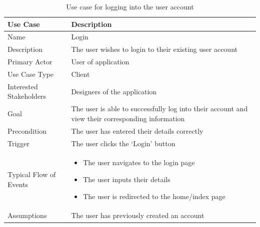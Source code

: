 \documentclass[10pt,twocolumn]{witseiepaper}
\begin{document}
		\begin{table}[htbp]
			\centering
			\caption{Use case for logging into the user account}
			\label{uc:login}
			\begin{tabular}{|p{}|p{}|}
				\hline
				\textbf{Use Case} & \textbf{Description} \\ \hline
				Name & Login \\ \hline
				Description & The user wishes to login to their existing user account \\ \hline
				Primary Actor & User of application \\ \hline
				Use Case Type & Client \\ \hline
				Interested Stakeholders & Designers of the application \\ \hline
				Goal & The user is able to successfully log into their account and view their corresponding information \\ \hline
				Precondition & The user has entered their details correctly \\ \hline
				Trigger & The user clicks the `Login' button \\ \hline
				Typical Flow of Events & 
				\begin{itemize}
					\item The user navigates to the login page
					\item The user inputs their details
					\item The user is redirected to the home/index page
				\end{itemize}
				\\ \hline
				Assumptions & The user has previously created an account \\
				\hline
			\end{tabular}
		\end{table}
		
\end{document}
